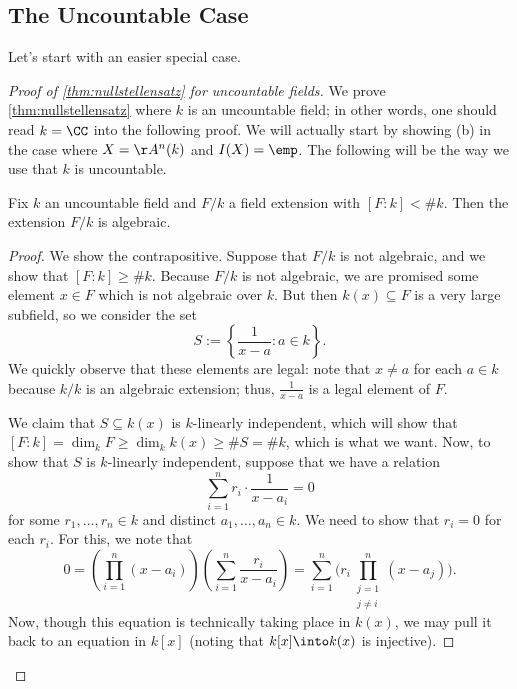 \subsection{The Uncountable Case}
Let's start with an easier special case.
\begin{proof}[Proof of \autoref{thm:nullstellensatz} for uncountable fields]
	We prove \autoref{thm:nullstellensatz} where $k$ is an uncountable field; in other words, one should read $k=\CC$ into the following proof. We will actually start by showing (b) in the case where $X=\AA^n(k)$ and $I(X)=\emp$. The following will be the way we use that $k$ is uncountable.
	\begin{lemma} \label{lem:useuncountable}
		Fix $k$ an uncountable field and $F/k$ a field extension with $[F:k]<\#k$. Then the extension $F/k$ is algebraic.
	\end{lemma}
	\begin{proof}
		We show the contrapositive. Suppose that $F/k$ is not algebraic, and we show that $[F:k]\ge\#k$. Because $F/k$ is not algebraic, we are promised some element $x\in F$ which is not algebraic over $k$. But then $k(x)\subseteq F$ is a very large subfield, so we consider the set
		\[S:=\left\{\frac1{x-a}:a\in k\right\}.\]
		We quickly observe that these elements are legal: note that $x\ne a$ for each $a\in k$ because $k/k$ is an algebraic extension; thus, $\frac1{x-a}$ is a legal element of $F$.
		
		We claim that $S\subseteq k(x)$ is $k$-linearly independent, which will show that $[F:k]=\dim_kF\ge\dim_kk(x)\ge\#S=\#k$, which is what we want. Now, to show that $S$ is $k$-linearly independent, suppose that we have a relation
		\[\sum_{i=1}^nr_i\cdot\frac1{x-a_i}=0\]
		for some $r_1,\ldots,r_n\in k$ and distinct $a_1,\ldots,a_n\in k$. We need to show that $r_i=0$ for each $r_i$. For this, we note that
		\[0=\left(\prod_{i=1}^n(x-a_i)\right)\left(\sum_{i=1}^n\frac{r_i}{x-a_i}\right)=\sum_{i=1}^n\Bigg(r_i\prod_{\substack{j=1\\j\ne i}}^n(x-a_j)\Bigg).\tag{$*$}\label{eq:readytoplug}\]
		Now, though this equation is technically taking place in $k(x)$, we may pull it back to an equation in $k[x]$ (noting that $k[x]\into k(x)$ is injective).


\end{proof}
\end{proof}
